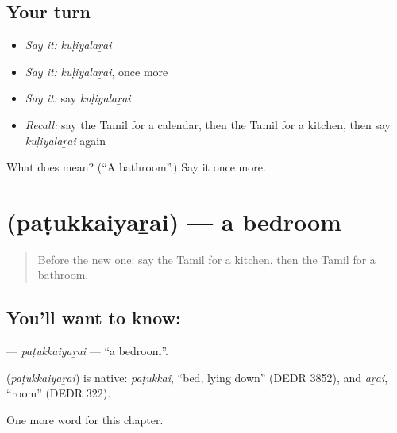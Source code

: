 \subsection*{Your turn}
\begin{itemize}
\raggedright
  \item \emph{Say it:} \emph{kuḷiyalaṟai}
  \item \emph{Say it:} \emph{kuḷiyalaṟai}, once more
  \item \emph{Say it:} say \emph{kuḷiyalaṟai}
  \item \emph{Recall:} say the Tamil for a calendar, then the Tamil for a kitchen, then say \emph{kuḷiyalaṟai} again
\end{itemize}

\begin{tcolorbox}[breakable,colback=teal!4,colframe=teal!35!black,title={Before you move on}]
What does  mean? (\textquotedblleft{}A bathroom\textquotedblright{}.) Say it once more.
\end{tcolorbox}
\section[\texorpdfstring{\ta{படுக்கையறை} (paṭukkaiyaṟai)}{படுக்கையறை (paṭukkaiyaṟai)}]{ (paṭukkaiyaṟai) — a bedroom}

\label{lesson:TA-C173-patukkaiyarai}



\begin{quote}
Before the new one: say the Tamil for a kitchen, then the Tamil for a bathroom.
\end{quote}

\subsection*{You'll want to know: }
\textbf{} — \emph{paṭukkaiyaṟai} — \textquotedblleft{}a bedroom\textquotedblright{}.

\begin{cousinweb}
\textbf{} (\emph{paṭukkaiyaṟai}) is native: \emph{paṭukkai}, \textquotedblleft{}bed, lying down\textquotedblright{} (DEDR 3852), and \emph{aṟai}, \textquotedblleft{}room\textquotedblright{} (DEDR 322).
\end{cousinweb}

\begin{grammarlens}[title={What you've built}]
One more word for this chapter.
\end{grammarlens}

